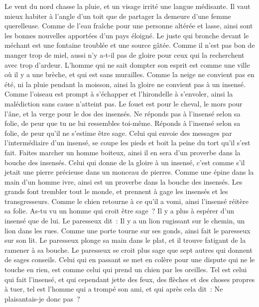 \begin{multicols}{2}
Le vent du nord chasse la pluie, et un visage irrité une langue médisante.
Il vaut mieux habiter à l'angle d'un toit que de partager la demeure d'une femme querelleuse.
Comme de l'eau fraîche pour une personne altérée et lasse, ainsi sont les bonnes nouvelles apportées d'un pays éloigné.
Le juste qui bronche devant le méchant est une fontaine troublée et une source gâtée.
Comme il n'est pas bon de manger trop de miel, aussi n'y a-t-il pas de gloire pour ceux qui la recherchent avec trop d'ardeur.
L'homme qui ne sait dompter son esprit est comme une ville où il y a une brèche, et qui est sans murailles.
\VerseOne{}Comme la neige ne convient pas en été, ni la pluie pendant la moisson, ainsi la gloire ne convient pas à un insensé.
Comme l'oiseau est prompt à s'échapper et l'hirondelle à s'envoler, ainsi la malédiction sans cause n'atteint pas.
Le fouet est pour le cheval, le mors pour l'âne, et la verge pour le dos des insensés.
Ne réponds pas à l'insensé selon sa folie, de peur que tu ne lui ressembles toi-même.
Réponds à l'insensé selon sa folie, de peur qu'il ne s'estime être sage.
Celui qui envoie des messages par l'intermédiaire d'un insensé, se coupe les pieds et boit la peine du tort qu'il s'est fait.
Faites marcher un homme boiteux, ainsi il en sera d'un proverbe dans la bouche des insensés.
Celui qui donne de la gloire à un insensé, c'est comme s'il jetait une pierre précieuse dans un monceau de pierres.
Comme une épine dans la main d'un homme ivre, ainsi est un proverbe dans la bouche des insensés.
Les grands font trembler tout le monde, et prennent à gage les insensés et les transgresseurs.
Comme le chien retourne à ce qu'il a vomi, ainsi l'insensé réitère sa folie.
As-tu vu un homme qui croit être sage~? Il y a plus à espérer d'un insensé que de lui.
Le paresseux dit~: Il y a un lion rugissant sur le chemin, un lion dans les rues.
Comme une porte tourne sur ses gonds, ainsi fait le paresseux sur son lit.
Le paresseux plonge sa main dans le plat, et il trouve fatigant de la ramener à sa bouche.
Le paresseux se croit plus sage que sept autres qui donnent de sages conseils.
Celui qui en passant se met en colère pour une dispute qui ne le touche en rien, est comme celui qui prend un chien par les oreilles.
Tel est celui qui fait l'insensé, et qui cependant jette des feux, des flèches et des choses propres à tuer,
tel est l'homme qui a trompé son ami, et qui après cela dit~: Ne plaisantais-je donc pas~?

\end{multicols}
